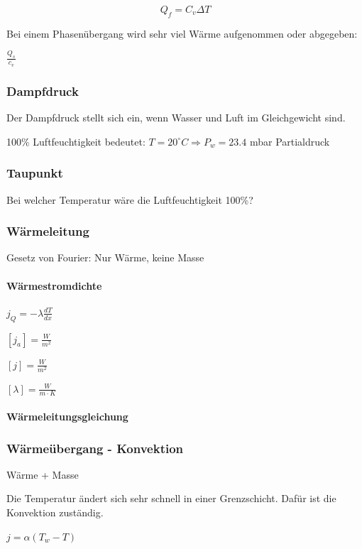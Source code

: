 \documentclass[a4paper]{scrartcl}
\begin{document}
\[
Q_f = C_v \Delta T
\]


Bei einem Phasenübergang wird sehr viel Wärme aufgenommen oder abgegeben:

$ \frac{Q_s}{c_v}$




\subsubsection{Dampfdruck}


Der Dampfdruck stellt sich ein, wenn Wasser und Luft im Gleichgewicht sind.

100\% Luftfeuchtigkeit bedeutet: $T = 20^\circ C \Rightarrow P_w = 23.4$ mbar Partialdruck


\subsubsection{Taupunkt}

Bei welcher Temperatur wäre die Luftfeuchtigkeit 100\%?


\subsubsection{Wärmeleitung}
Gesetz von Fourier: Nur Wärme, keine Masse

\paragraph{Wärmestromdichte} $j_Q = - \lambda \frac{dT}{dx}$


$[j_a] = \frac{W}{m^2}$


$[j] = \frac{W}{m^2}$

$[\lambda] = \frac{W}{m \cdot K}$

\paragraph{Wärmeleitungsgleichung} %

\subsubsection{Wärmeübergang - Konvektion}
Wärme + Masse

Die Temperatur ändert sich sehr schnell in einer Grenzschicht. Dafür ist die Konvektion zuständig.

$j = \alpha (T_w - T)$
\end{document}
